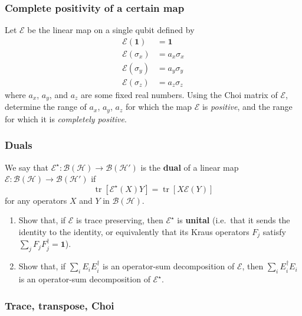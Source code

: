 \documentclass[fleqn,a4paper]{article}
\providecommand{\tightlist}{\setlength{\itemsep}{0pt}\setlength{\parskip}{0pt}}
\theoremstyle{definition}
\theoremstyle{definition}
\theoremstyle{definition}
\theoremstyle{definition}
\theoremstyle{remark}
\begin{document}
\hypertarget{complete-positivity-of-a-certain-map}{%
\subsubsection{Complete positivity of a certain map}\label{complete-positivity-of-a-certain-map}}

Let \(\mathcal{E}\) be the linear map on a single qubit defined by
\[
  \begin{aligned}
    \mathcal{E}(\mathbf{1})
    &= \mathbf{1}
  \\\mathcal{E}(\sigma_x)
    &= a_x\sigma_x
  \\\mathcal{E}(\sigma_y)
    &= a_y\sigma_y
  \\\mathcal{E}(\sigma_z)
    &= a_z\sigma_z
  \end{aligned}
\]
where \(a_x\), \(a_y\), and \(a_z\) are some fixed real numbers.
Using the Choi matrix of \(\mathcal{E}\), determine the range of \(a_x\), \(a_y\), \(a_z\) for which the map \(\mathcal{E}\) is \emph{positive}, and the range for which it is \emph{completely positive}.

\hypertarget{duals}{%
\subsubsection{Duals}\label{duals}}

We say that \(\mathcal{E}^\star\colon\mathcal{B}(\mathcal{H})\to\mathcal{B}(\mathcal{H}')\) is the \textbf{dual} of a linear map \(\mathcal{E}\colon\mathcal{B}(\mathcal{H})\to\mathcal{B}(\mathcal{H}')\) if
\[
  \operatorname{tr}[\mathcal{E}^\star (X)Y] = \operatorname{tr}[X\mathcal{E}(Y)]
\]
for any operators \(X\) and \(Y\) in \(\mathcal{B}(\mathcal{H})\).

\begin{enumerate}
\def\labelenumi{\arabic{enumi}.}
\tightlist
\item
  Show that, if \(\mathcal{E}\) is trace preserving, then \(\mathcal{E}^\star\) is \textbf{unital} (i.e.~that it sends the identity to the identity, or equivalently that its Kraus operators \(F_j\) satisfy \(\sum_j F_jF_j^\dagger=\mathbf{1}\)).
\item
  Show that, if \(\sum_i E_i E_i^\dagger\) is an operator-sum decomposition of \(\mathcal{E}\), then \(\sum_i E^\dagger_i E_i\) is an operator-sum decomposition of \(\mathcal{E}^\star\).
\end{enumerate}

\hypertarget{trace-transpose-choi}{%
\subsubsection{Trace, transpose, Choi}\label{trace-transpose-choi}}
\end{document}
